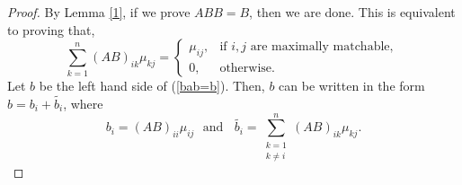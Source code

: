 \documentclass[notitlepage,12pt,reqno]{amsart}
\numberwithin{equation}{section}
\begin{document}
\begin{proof}
By Lemma \ref{1}, if we prove $ABB=B$, then we are done. This is equivalent to proving that,
\begin{equation}\label{bab=b}
\sum _{k=1}^n(AB)_{ik}\mu _{kj}=\left\{\begin{array}{ll}
\mu _{ij}, & \mbox{if }i,j\mbox{ are maximally matchable, }  \\
0, & \mbox{otherwise}.
\end{array}\right .
\end{equation}
Let $b$ be the left hand side of (\ref{bab=b}). Then, $b$ can be written in the form $b=b_i+\tilde{b_i}$, where
$$b_i=(AB)_{ii}\mu _{ij}\  \  \  \mbox{and}\  \  \  \  \tilde{b_i}=\sum _{\substack {k=1 \\ k\neq i}}^n(AB)_{ik}\mu _{kj}.$$

\end{proof}
\end{document}
